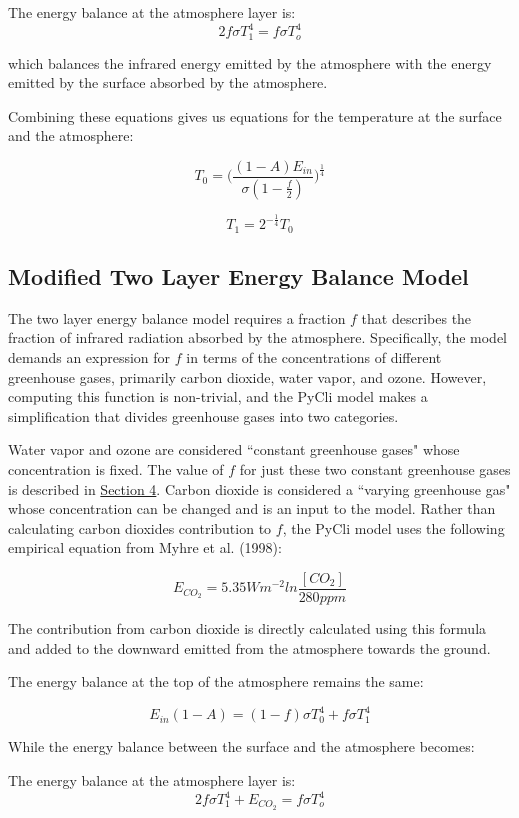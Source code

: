 \documentclass[12pt]{article} %
\begin{document}
The energy balance at the atmosphere layer is: 
$$2f\sigma T_1^4 = f\sigma T_o^4$$

which balances the infrared energy emitted by the atmosphere with the energy emitted by the surface absorbed by the atmosphere.

Combining these equations gives us equations for the temperature at the surface and the atmosphere:

$$T_0 = \bigg( \frac{(1-A)E_{in}}{\sigma(1-\frac{f}{2})}  \bigg)^{\frac{1}{4}}$$

$$T_1 =  2^{-\frac{1}{4}} T_0 $$

\subsection{Modified Two Layer Energy Balance Model}

The two layer energy balance model requires a fraction $f$ that describes the fraction of infrared radiation absorbed by the atmosphere. Specifically, the model demands an expression for $f$ in terms of the concentrations of different greenhouse gases, primarily carbon dioxide, water vapor, and ozone. However, computing this function is non-trivial, and the PyCli model makes a simplification that divides greenhouse gases into two categories.

Water vapor and ozone are considered ``constant greenhouse gases" whose concentration is fixed. The value of $f$ for just these two constant greenhouse gases is described in \hyperref[sec:atmos]{Section 4}. Carbon dioxide is considered a ``varying greenhouse gas" whose concentration can be changed and is an input to the model. Rather than calculating carbon dioxides contribution to $f$, the PyCli model uses the following empirical equation from Myhre et al. (1998):

$$ E_{CO_2} = 5.35 W m^{-2} ln \frac{[CO_2]}{280ppm}$$

The contribution from carbon dioxide is directly calculated using this formula and added to the downward emitted from the atmosphere towards the ground.


The energy balance at the top of the atmosphere remains the same:

$$ E_{in}(1-A)  = (1-f) \sigma T_0^4 + f \sigma T_1^4$$

While the energy balance between the surface and the atmosphere becomes:

The energy balance at the atmosphere layer is: 
$$2f\sigma T_1^4 + E_{CO_2} = f\sigma T_o^4$$
\end{document}
